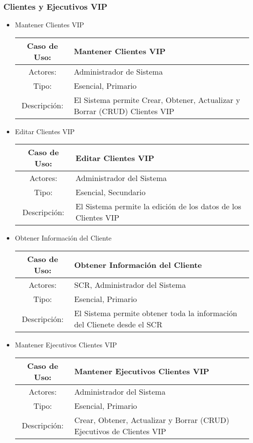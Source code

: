 \subsubsection{Clientes y Ejecutivos VIP}

\begin{itemize}
	\item Mantener Clientes VIP\\
		\begin{tabular}[5 cm]{|c|p{11cm}|}\hline
			Caso de Uso: & Mantener Clientes VIP\\\hline
			Actores: & Administrador de Sistema\\\hline
			Tipo: & Esencial, Primario\\\hline
			Descripción: & El Sistema permite Crear, Obtener, Actualizar y Borrar (CRUD) Clientes VIP\\\hline
		\end{tabular}

	\item Editar Clientes VIP\\
		\begin{tabular}[5 cm]{|c|p{11cm}|}\hline
			Caso de Uso: & Editar Clientes VIP\\\hline
			Actores: & Administrador del Sistema\\\hline
			Tipo: & Esencial, Secundario\\\hline
			Descripción: & El Sistema permite la edición de los datos de los Clientes VIP\\\hline
		\end{tabular}

	\item Obtener Información del Cliente\\
		\begin{tabular}{|c|p{11cm}|}\hline
			Caso de Uso: & Obtener Información del Cliente\\\hline
			Actores: & SCR, Administrador del Sistema\\\hline
			Tipo: & Esencial, Primario\\\hline
			Descripción: &El Sistema permite obtener toda la información del Clienete desde el SCR\\\hline
		\end{tabular}

	\item Mantener Ejecutivos Clientes VIP\\
		\begin{tabular}{|c|p{11cm}|}\hline
			Caso de Uso: & Mantener Ejecutivos Clientes VIP\\\hline
			Actores: &Administrador del Sistema\\\hline
			Tipo: & Esencial, Primario\\\hline
			Descripción: & Crear, Obtener, Actualizar y Borrar (CRUD) Ejecutivos de Clientes VIP\\\hline
		\end{tabular}


\end{itemize}
